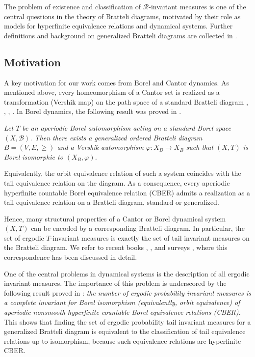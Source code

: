 \documentclass[11pt,reqno]{amsart}
\theoremstyle{definition}
\theoremstyle{remark}
\theoremstyle{plain}
\newcommand{\B}{\mathcal B}
\numberwithin{equation}{section}
\begin{document}
The problem of existence and classification of $\mathcal R$-invariant measures is one of the central questions in the theory of Bratteli diagrams, motivated by their role as models for hyperfinite equivalence relations and dynamical systems.
 Further definitions and background on generalized Bratteli diagrams are collected in . 
  
\subsection{Motivation}
A key motivation for our work comes from Borel and Cantor dynamics. As mentioned above, every homeomorphism of a Cantor set is realized as a transformation (Vershik map) on the path space of a standard Bratteli diagram \cite{HermanPutnamSkau1992}, \cite{Medynets_2006}, \cite{DownarowiczKarpel_2019}, \cite{Shimomura2020}.  
In Borel dynamics, the following result was proved in \cite{BezuglyiDooleyKwiatkowski_2006}.

\textit{Let $T$ be an aperiodic Borel automorphism acting on a standard Borel space $(X, \B)$. Then there exists a 
generalized ordered Bratteli diagram $B=(V,E,\geq)$ and a Vershik automorphism $\varphi : X_B \to X_B$ such that $(X, T)$ is Borel isomorphic to $(X_B,\varphi)$.}


Equivalently, the orbit equivalence relation of such a system coincides with the tail equivalence relation on the diagram. As a consequence, every aperiodic hyperfinite countable Borel equivalence relation (CBER) admits a realization as a tail equivalence relation on a Bratteli diagram, standard or generalized.  

Hence, many structural properties of a Cantor or Borel dynamical system 
$(X, T)$ can be encoded by a corresponding Bratteli diagram. In particular, the set of ergodic $T$-invariant measures is exactly the set of tail invariant measures on the Bratteli diagram. We refer to recent books \cite{Putnam2018}, \cite{DurandPerrin2022}, and surveys \cite{Durand2010}, \cite{BezuglyiKarpel2016} where this correspondence has been discussed in detail.

One of the central problems in dynamical systems is the description of all ergodic invariant measures.
The importance of this problem is underscored by the following result proved in \cite{Dougherty_Jackson_Kechris1994}: \textit{the number of ergodic probability invariant measures is a complete invariant for Borel isomorphism (equivalently, orbit equivalence) of aperiodic nonsmooth hyperfinite countable Borel equivalence relations (CBER).} 
This shows that finding the set of ergodic probability tail invariant measures for a generalized Bratteli diagram is equivalent to the classification of tail equivalence relations up to isomorphism, because such equivalence relations are hyperfinite CBER.
\end{document}
